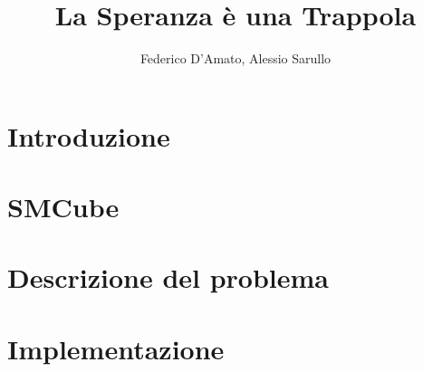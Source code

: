 \documentclass{article}
\title{La Speranza è una Trappola}
\author{Federico D'Amato, Alessio Sarullo}
\begin{document}
\maketitle


\section{Introduzione}

\section{SMCube}

\section{Descrizione del problema}
\label{Sec:problem}

\section{Implementazione}




\newpage
\nocite{*}		 %
{}

\end{document}
